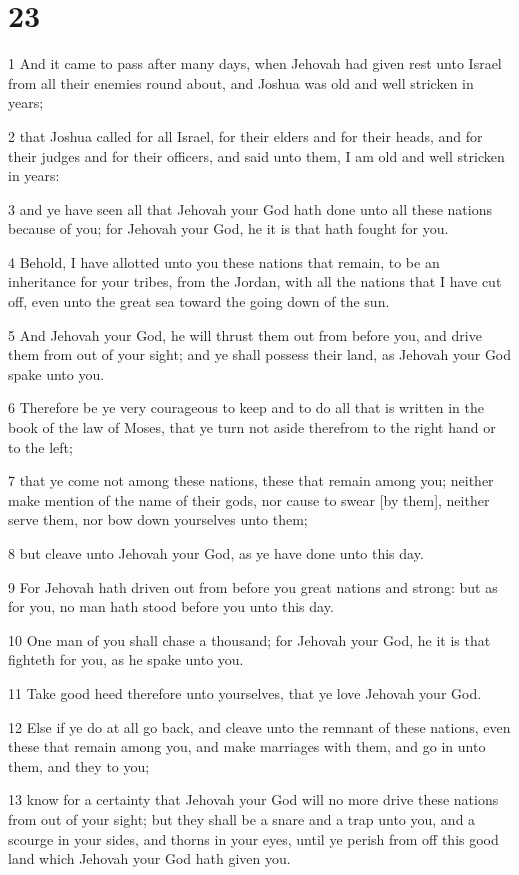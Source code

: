 \chapter{23}

\par 1 And it came to pass after many days, when Jehovah had given rest unto Israel from all their enemies round about, and Joshua was old and well stricken in years;
\par 2 that Joshua called for all Israel, for their elders and for their heads, and for their judges and for their officers, and said unto them, I am old and well stricken in years:
\par 3 and ye have seen all that Jehovah your God hath done unto all these nations because of you; for Jehovah your God, he it is that hath fought for you.
\par 4 Behold, I have allotted unto you these nations that remain, to be an inheritance for your tribes, from the Jordan, with all the nations that I have cut off, even unto the great sea toward the going down of the sun.
\par 5 And Jehovah your God, he will thrust them out from before you, and drive them from out of your sight; and ye shall possess their land, as Jehovah your God spake unto you.
\par 6 Therefore be ye very courageous to keep and to do all that is written in the book of the law of Moses, that ye turn not aside therefrom to the right hand or to the left;
\par 7 that ye come not among these nations, these that remain among you; neither make mention of the name of their gods, nor cause to swear [by them], neither serve them, nor bow down yourselves unto them;
\par 8 but cleave unto Jehovah your God, as ye have done unto this day.
\par 9 For Jehovah hath driven out from before you great nations and strong: but as for you, no man hath stood before you unto this day.
\par 10 One man of you shall chase a thousand; for Jehovah your God, he it is that fighteth for you, as he spake unto you.
\par 11 Take good heed therefore unto yourselves, that ye love Jehovah your God.
\par 12 Else if ye do at all go back, and cleave unto the remnant of these nations, even these that remain among you, and make marriages with them, and go in unto them, and they to you;
\par 13 know for a certainty that Jehovah your God will no more drive these nations from out of your sight; but they shall be a snare and a trap unto you, and a scourge in your sides, and thorns in your eyes, until ye perish from off this good land which Jehovah your God hath given you.
